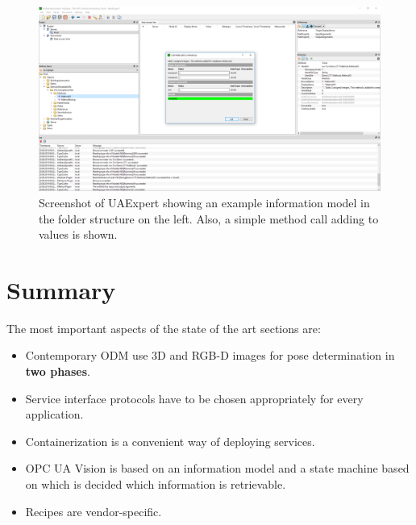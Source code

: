\begin{landscape}
\begin{figure}[ht]
    \centering
    \includegraphics[width=1.5\textwidth]{img/UAExpertScreenshot.png}
    \caption{Screenshot of UAExpert showing an example information model in the folder structure on the left. Also, a simple method call adding to values is shown.}
    \label{fig:uaexpert}
\end{figure}
\end{landscape}

\section{Summary}
The most important aspects of the state of the art sections are:
\begin{itemize}
    \item Contemporary ODM use 3D and RGB-D images for pose determination in \textbf{two phases}.
    \item Service interface protocols have to be chosen appropriately for every application.
    \item Containerization is a convenient way of deploying services.
    \item OPC UA Vision is based on an information model and a state machine based on which is decided which information is retrievable.
    \item Recipes are vendor-specific.
\end{itemize}
